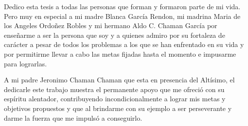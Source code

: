 Dedico esta tesis a todas las personas que forman y formaron parte de mi vida. Pero muy en especial a mi madre Blanca Garc\'ia Rendon, 
mi madrina Maria de los Angeles Ordo\~nez Robles y mi hermano Aldo C. Chaman Garc\'ia por ense\~narme a ser la persona que soy 
y a quienes admiro por su fortaleza de car\'acter a pesar de todos los problemas a los que se han enfrentado en su vida y por permitirme 
llevar a cabo las metas fijadas hasta el momento e impusarme para lograrlas.

A mi padre Jeronimo Chaman Chaman que esta en presencia del Alt\'isimo, el dedicarle este trabajo muestra el permanente apoyo que me ofreci\'o 
con su esp\'iritu alentador, contribuyendo incondicionalmente a lograr mis metas y objetivos propuestos y que al brindarme con su ejemplo a ser 
perseverante y darme la fuerza que me impuls\'o a conseguirlo. 



